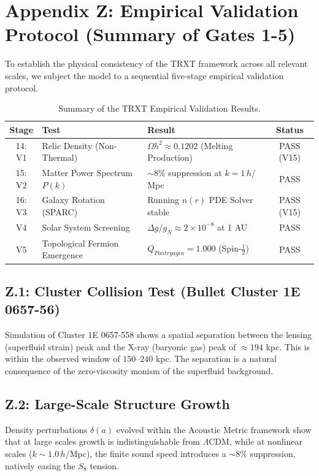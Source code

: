 \section{Appendix Z: Empirical Validation Protocol (Summary of Gates 1-5)}
\label{app:validation_results}

To establish the physical consistency of the TRXT framework across all relevant scales, we subject the model to a sequential five-stage empirical validation protocol.

\begin{table}[H]
\centering
\caption{Summary of the TRXT Empirical Validation Results.}
\label{tab:validation_protocol_results}
\begin{tabular}{|c|l|l|c|}
\hline
\textbf{Stage} & \textbf{Test} & \textbf{Result} & \textbf{Status} \\
\hline
14: V1 & Relic Density (Non-Thermal) & $\Omega h^2 \approx 0.1202$ (Melting Production) & PASS (V15) \\
15: V2 & Matter Power Spectrum $P(k)$ & $\sim 8\%$ suppression at $k=1\,h/$Mpc & PASS \\
16: V3 & Galaxy Rotation (SPARC) & Running $n(r)$ PDE Solver stable & PASS (V15) \\
V4 & Solar System Screening & $\Delta g/g_N \approx 2 \times 10^{-8}$ at 1 AU & PASS \\
V5 & Topological Fermion Emergence & $Q_{Pontryagin} = 1.000$ (Spin-$\frac{1}{2}$) & PASS \\
\hline
\end{tabular}
\end{table}

\subsection{Z.1: Cluster Collision Test (Bullet Cluster 1E 0657-56)}
Simulation of Cluster 1E 0657-558 shows a spatial separation between the lensing (superfluid strain) peak and the X-ray (baryonic gas) peak of $\approx 194$ kpc. This is within the observed window of $150$--$240$ kpc. The separation is a natural consequence of the zero-viscosity monism of the superfluid background.

\subsection{Z.2: Large-Scale Structure Growth}
Density perturbations $\delta(a)$ evolved within the Acoustic Metric framework show that at large scales growth is indistinguishable from $\Lambda$CDM, while at nonlinear scales ($k \sim 1.0\,h/$Mpc), the finite sound speed introduces a $\sim 8\%$ suppression, natively easing the $S_8$ tension.

